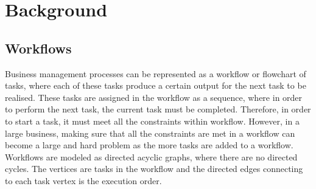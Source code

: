 \documentclass[a4paper]{report}
\begin{document}
\chapter{Background}
\section{Workflows}
\setlength{\parindent}{4em}
Business management processes can be represented as a workflow or flowchart of tasks, where each of these tasks produce a certain output for the next task to be realised. These tasks are assigned in the workflow as a sequence, where in order to perform the next task, the current task must be completed. Therefore, in order to start a task, it must meet all the constraints within workflow. However, in a large business, making sure that all the constraints are met in a workflow can become a large and hard problem as the more tasks are added to a workflow. Workflows are modeled as directed acyclic graphs\cite{AcyclicDigraph}, where there are no directed cycles. The vertices are tasks in the workflow and the directed edges connecting to each task vertex is the execution order. \\
\end{document}
